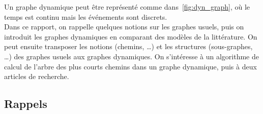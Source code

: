 \documentclass[12pt,a4paper]{article}
\begin{document}
Un graphe dynamique peut être représenté comme
dans~\ref{fig:dyn_graph}, où le temps est continu mais les événements
sont discrets.\\

Dans ce rapport, on rappelle quelques notions sur les graphes usuels,
puis on introduit les graphes dynamiques en comparant des modèles de
la littérature. On peut ensuite transposer les notions (chemins, …)
et les structures (sous-graphes, …) des graphes usuels aux graphes
dynamiques. On s'intéresse à un algorithme de calcul de l'arbre des
plus courts chemins dans un graphe dynamique, puis à deux articles de
recherche.

\subsection{Rappels}
\end{document}
